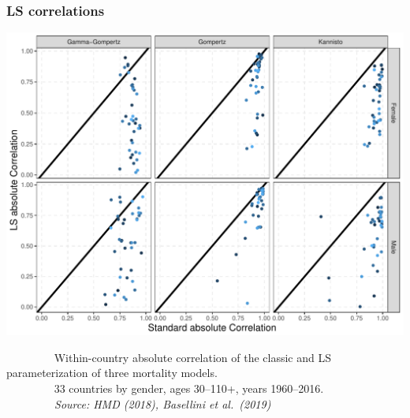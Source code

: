 \documentclass[12pt, xcolor=table]{beamer}  %
\begin{document}
\begin{frame}[noframenumbering]
\frametitle{LS correlations}
\vspace{-0.05cm}
\begin{center}
\includegraphics[scale=0.41]{Figures/Ch1/F8}
\end{center}
\vspace{-0.05cm}
\tiny{$\quad\quad\quad\quad$ Within-country absolute correlation of the classic and LS parameterization of three mortality models.\\ $\quad\quad\quad\quad$ 33 countries by gender, ages 30--110+, years 1960--2016. \\ \emph{$\quad\quad\quad\quad$ Source: HMD (2018), Basellini et al.~(2019)}} \\
\end{frame}

\end{document}
